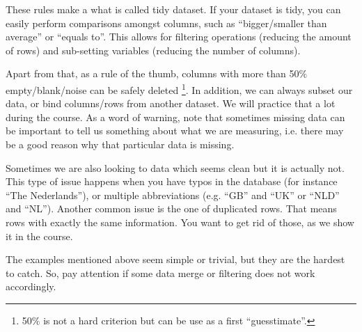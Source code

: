 These rules make a what is called tidy dataset. If your dataset is tidy, you can easily perform comparisons amongst columns, such as ``bigger/smaller than average'' or ``equals to''. This allows for filtering operations (reducing the amount of rows) and sub-setting variables (reducing the number of columns). 


Apart from that, as a rule of the thumb, columns with more than 50$\%$ empty/blank/noise can be safely deleted \footnote{50$\%$ is not a hard criterion but can be use as a first ``guesstimate''.}. In addition, we can always subset our data, or bind columns/rows from another dataset. We will practice that a lot during the course. As a word of warning, note that sometimes missing data can be important to tell us something about what we are measuring, i.e. there may be a good reason why that particular data is missing.

Sometimes we are also looking to data which seems clean but it is actually not. This type of issue happens when you have typos in the database (for instance ``The Nederlands''), or multiple abbreviations (e.g. ``GB'' and ``UK'' or ``NLD'' and ``NL''). Another common issue is the one of duplicated rows. That means rows with exactly the same information. You want to get rid of those, as we show it in the course.

The examples mentioned above seem simple or trivial, but they are the hardest to catch. So, pay attention if some data merge or filtering does not work accordingly.




 